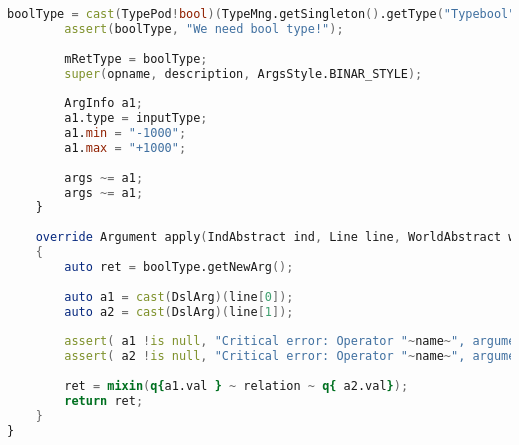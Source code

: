 \documentclass[russian,utf8,emptystyle]{eskdtext}
\begin{document}
\begin{lstlisting}[language=D]
        boolType = cast(TypePod!bool)(TypeMng.getSingleton().getType("Typebool"));
        assert(boolType, "We need bool type!");
        
        mRetType = boolType;
        super(opname, description, ArgsStyle.BINAR_STYLE);
        
        ArgInfo a1;
        a1.type = inputType;
        a1.min = "-1000";
        a1.max = "+1000";
        
        args ~= a1;
        args ~= a1;
    }
    
    override Argument apply(IndAbstract ind, Line line, WorldAbstract world)
    {
        auto ret = boolType.getNewArg();
        
        auto a1 = cast(DslArg)(line[0]);
        auto a2 = cast(DslArg)(line[1]);
        
        assert( a1 !is null, "Critical error: Operator "~name~", argument 1 isn't a right value!");
        assert( a2 !is null, "Critical error: Operator "~name~", argument 2 isn't a right value!");
        
        ret = mixin(q{a1.val } ~ relation ~ q{ a2.val});
        return ret;
    }   
}
\end{lstlisting}
\end{document}
